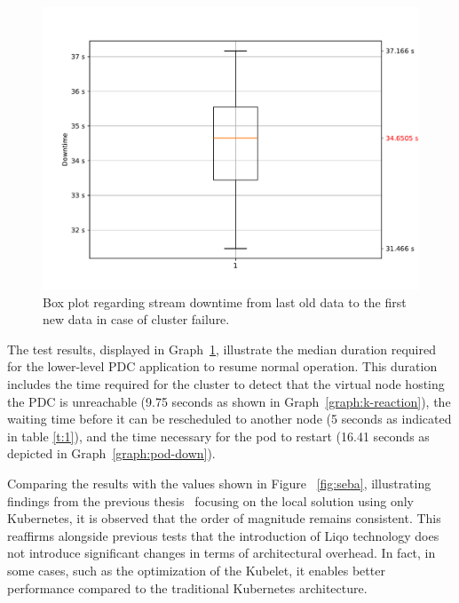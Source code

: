 \begin{figure}[ht]\centering
\includegraphics[scale=0.5]{Pictures/pdc-cluster-down}
\caption{Box plot regarding stream downtime from last old data to the first new data in case of cluster failure.}\label{graph:cluster-down}
\end{figure}

The test results, displayed in Graph~\ref{graph:cluster-down}, illustrate the median duration required for the lower-level PDC application to resume normal operation. This duration includes the time required for the cluster to detect that the virtual node hosting the PDC is unreachable (9.75 seconds as shown in Graph~\ref{graph:k-reaction}), the waiting time before it can be rescheduled to another node (5 seconds as indicated in table \ref{t:1}), and the time necessary for the pod to restart (16.41 seconds as depicted in Graph~\ref{graph:pod-down}).

Comparing the results with the values shown in Figure ~\ref{fig:seba}, illustrating findings from the previous thesis~\cite{e3-1} focusing on the local solution using only Kubernetes, it is observed that the order of magnitude remains consistent. This reaffirms alongside previous tests that the introduction of Liqo technology does not introduce significant changes in terms of architectural overhead. In fact, in some cases, such as the optimization of the Kubelet, it enables better performance compared to the traditional Kubernetes architecture.


